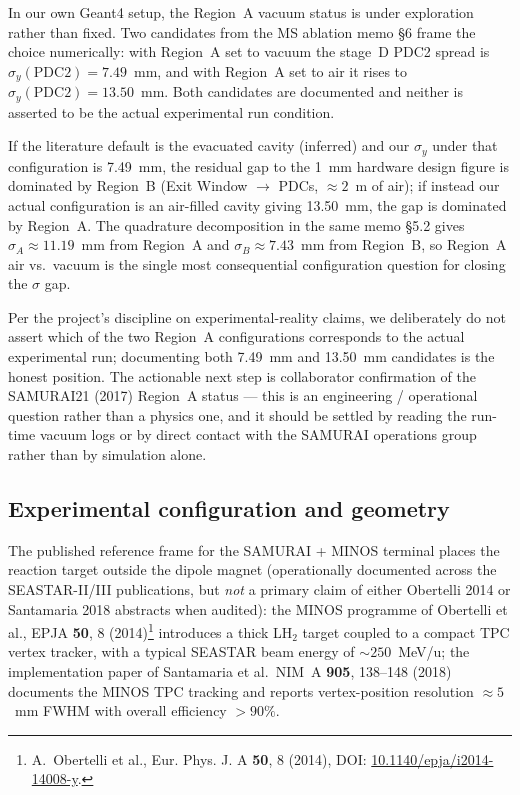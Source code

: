 \documentclass[a4paper, 11pt]{article}
\begin{document}
In our own Geant4 setup, the Region~A vacuum status is under exploration rather than fixed. Two candidates from the MS ablation memo §6 frame the choice numerically: with Region~A set to vacuum the stage~D PDC2 spread is $\sigma_y(\text{PDC2}) = 7.49$~mm, and with Region~A set to air it rises to $\sigma_y(\text{PDC2}) = 13.50$~mm. Both candidates are documented and neither is asserted to be the actual experimental run condition.

If the literature default is the evacuated cavity (inferred) and our $\sigma_y$ under that configuration is 7.49~mm, the residual gap to the 1~mm hardware design figure is dominated by Region~B (Exit Window $\to$ PDCs, $\approx 2$~m of air); if instead our actual configuration is an air-filled cavity giving 13.50~mm, the gap is dominated by Region~A. The quadrature decomposition in the same memo §5.2 gives $\sigma_A \approx 11.19$~mm from Region~A and $\sigma_B \approx 7.43$~mm from Region~B, so Region~A air vs.\ vacuum is the single most consequential configuration question for closing the $\sigma$ gap.

Per the project's discipline on experimental-reality claims, we deliberately do not assert which of the two Region~A configurations corresponds to the actual experimental run; documenting both 7.49~mm and 13.50~mm candidates is the honest position. The actionable next step is collaborator confirmation of the SAMURAI21 (2017) Region~A status --- this is an engineering / operational question rather than a physics one, and it should be settled by reading the run-time vacuum logs or by direct contact with the SAMURAI operations group rather than by simulation alone.

\subsection{Experimental configuration and geometry}
The published reference frame for the SAMURAI + MINOS terminal places the reaction target outside the dipole magnet (operationally documented across the SEASTAR-II/III publications, but \emph{not} a primary claim of either Obertelli 2014 or Santamaria 2018 abstracts when audited): the MINOS programme of Obertelli et al., EPJA \textbf{50}, 8 (2014)\footnote{\label{fn:obertelli2014}A.~Obertelli et al., Eur. Phys. J. A \textbf{50}, 8 (2014), DOI: \href{https://doi.org/10.1140/epja/i2014-14008-y}{10.1140/epja/i2014-14008-y}.} introduces a thick LH$_2$ target coupled to a compact TPC vertex tracker, with a typical SEASTAR beam energy of $\sim 250$~MeV/u; the implementation paper of Santamaria et al.\ NIM~A \textbf{905}, 138--148 (2018) documents the MINOS TPC tracking and reports vertex-position resolution $\approx 5$~mm FWHM with overall efficiency $> 90\%$.
\end{document}
